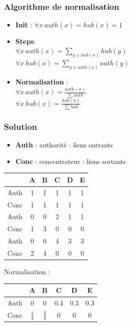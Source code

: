     \subsubsection*{Algorithme de normalisation}
    
    \begin{itemize}
        \item \textbf{Init} :  $ \forall x \: auth(x) = hub(x) = 1 $
        \item \textbf{Steps}: \\
            $\forall x \: auth(x) = \sum_{y \in hub(x)} hub(y)  $ \\
            $\forall x \: hub(x) = \sum_{y \in auth(x)} auth(y)  $
        \item \textbf{Normalisation} : \\
            $ \forall x \: auth(x) = \frac{auth(x)}{\sum auth} $ \\
            $ \forall x \: hub(x) = \frac{hub(x)}{\sum hub} $
    \end{itemize}

    \subsubsection*{Solution}
    \begin{itemize}
        \item \textbf{Auth} : authorité : liens entrants
        \item \textbf{Conc} : concentrateur : liens sortants
    \end{itemize}

    \begin{center}
    	\begin{tabular}{c|ccccc}
    	     & A & B & C & D & E\\ \hline
    	Auth & 1 & 1 & 1 & 1 & 1\\
    	Conc & 1 & 1 & 1 & 1 & 1\\ \hline
    	Auth & 0 & 0 & 2 & 1 & 1\\
    	Conc & 1 & 3 & 0 & 0 & 0\\ \hline
    	Auth & 0 & 0 & 4 & 3 & 3\\
    	Conc & 2 & 4 & 0 & 0 & 0\\ \hline
    	\end{tabular}
    \end{center}
    
    Normalisation :
    \begin{center}
    	\begin{tabular}{c|ccccc}
    	     & A & B & C & D & E\\ \hline
    	Auth & 0 & 0 & 0.4 & 0.3 & 0.3\\
    	Conc & $\frac{1}{3}$ & $\frac{2}{3}$ & 0 & 0 & 0\\ \hline
    	\end{tabular}
    \end{center}
    

